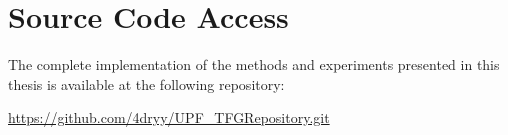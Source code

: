 \chapter{Source Code Access}
\label{app:source-code}

The complete implementation of the methods and experiments presented in this thesis is available at the following repository:

\noindent\url{https://github.com/4dryy/UPF_TFGRepository.git}
